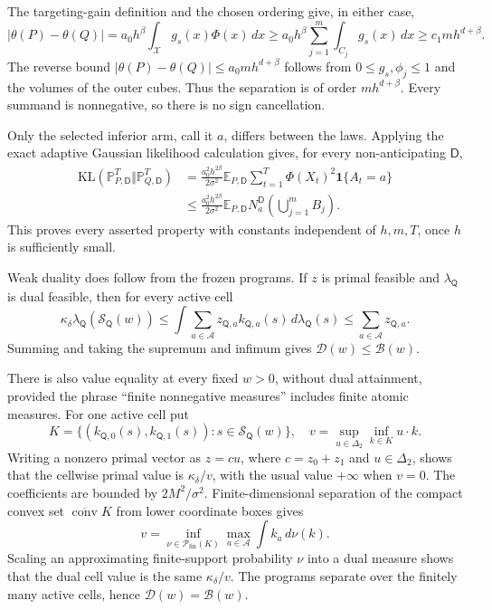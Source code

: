 The targeting-gain definition and the chosen ordering give, in either case,
\[
|\theta(P)-\theta(Q)|
=a_0h^\beta\int_{\mathcal X}g_s(x)\Phi(x)\,dx
\geq a_0h^\beta\sum_{j=1}^m\int_{C_j}g_s(x)\,dx
\geq c_1mh^{d+\beta}.
\]
The reverse bound \(|\theta(P)-\theta(Q)|\leq a_0mh^{d+\beta}\) follows from \(0\leq g_s,\phi_j\leq1\) and the volumes of the outer cubes.  Thus the separation is of order \(mh^{d+\beta}\).  Every summand is nonnegative, so there is no sign cancellation.

Only the selected inferior arm, call it \(a\), differs between the laws.  Applying the exact adaptive Gaussian likelihood calculation gives, for every non-anticipating \(\mathsf D\),
\[
\begin{aligned}
\mathrm{KL}(\mathbb P_{P,\mathsf D}^{T}\Vert\mathbb P_{Q,\mathsf D}^{T})
&=\frac{a_0^2h^{2\beta}}{2\sigma^2}
  \mathbb E_{P,\mathsf D}\sum_{t=1}^T
  \Phi(X_t)^2\mathbf 1\{A_t=a\}\\
&\leq \frac{a_0^2h^{2\beta}}{2\sigma^2}
  \mathbb E_{P,\mathsf D}N_a^{\mathsf D}\!\left(\bigcup_{j=1}^mB_j\right).
\end{aligned}
\]
This proves every asserted property with constants independent of \(h,m,T\), once \(h\) is sufficiently small.

Weak duality does follow from the frozen programs.  If \(z\) is primal feasible and \(\lambda_{\mathsf Q}\) is dual feasible, then for every active cell
\[
\kappa_\delta\lambda_{\mathsf Q}(\mathcal S_{\mathsf Q}(w))
\leq\int\sum_{a\in\mathcal A}z_{\mathsf Q,a}k_{\mathsf Q,a}(s)\,d\lambda_{\mathsf Q}(s)
\leq\sum_{a\in\mathcal A}z_{\mathsf Q,a}.
\]
Summing and taking the supremum and infimum gives \(\mathcal D(w)\leq\mathcal B(w)\).

There is also value equality at every fixed \(w>0\), without dual attainment, provided the phrase ``finite nonnegative measures'' includes finite atomic measures.  For one active cell put
\[
K=\{(k_{\mathsf Q,0}(s),k_{\mathsf Q,1}(s)):s\in\mathcal S_{\mathsf Q}(w)\},
\quad
v=\sup_{u\in\Delta_2}\inf_{k\in K}u\cdot k.
\]
Writing a nonzero primal vector as \(z=c u\), where \(c=z_0+z_1\) and \(u\in\Delta_2\), shows that the cellwise primal value is \(\kappa_\delta/v\), with the usual value \(+\infty\) when \(v=0\).  The coefficients are bounded by \(2M^2/\sigma^2\).  Finite-dimensional separation of the compact convex set \(\overline{\operatorname{conv}}K\) from lower coordinate boxes gives
\[
v=\inf_{\nu\in\mathcal P_{\mathrm{fin}}(K)}
\max_{a\in\mathcal A}\int k_a\,d\nu(k).
\]
Scaling an approximating finite-support probability \(\nu\) into a dual measure shows that the dual cell value is the same \(\kappa_\delta/v\).  The programs separate over the finitely many active cells, hence \(\mathcal D(w)=\mathcal B(w)\).

